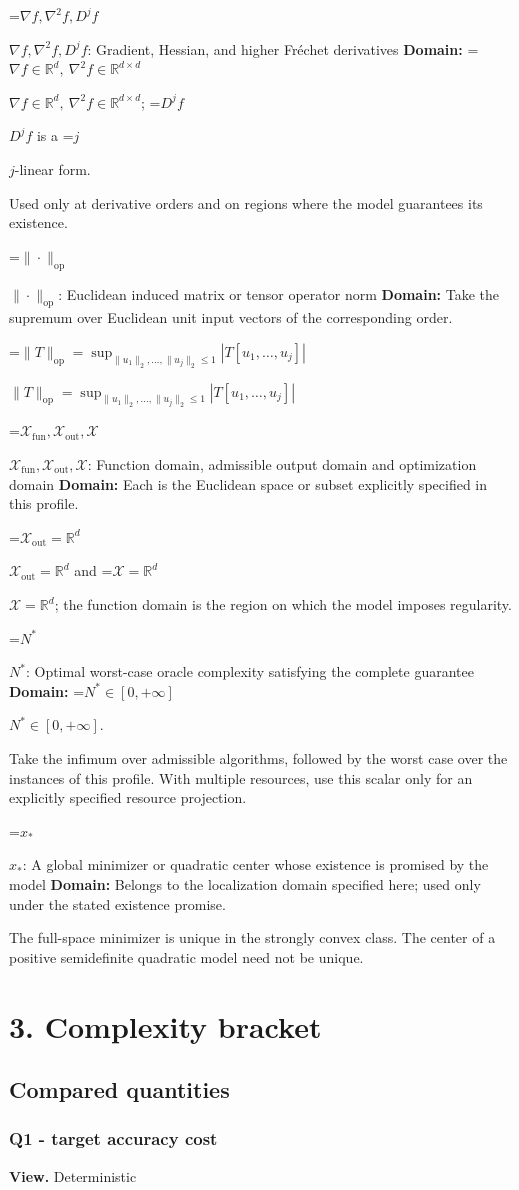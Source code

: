 \documentclass[10pt,a4paper]{article}
\newcommand{\AtlasMath}[1]{\par\begingroup\centering\setbox0=\hbox{$\displaystyle #1$}\ifdim\wd0>1.4\linewidth\typeout{ATLAS WIDE FORMULA: \the\wd0}\fi\ifdim\wd0>\linewidth\resizebox{\linewidth}{!}{\box0}\else\box0\fi\par\endgroup}
\newcommand{\AtlasInlineMath}[1]{\begingroup\setbox0=\hbox{$#1$}\ifdim\wd0>.4\linewidth\endgroup\AtlasMath{#1}\else\endgroup$#1$\fi}
\begin{document}
\AtlasInlineMath{\nabla f,\nabla^2f,D^jf}: Gradient, Hessian, and higher Fréchet derivatives \textbf{Domain:} \AtlasInlineMath{\nabla f\in\mathbb{R}^d,\ \nabla^2f\in\mathbb{R}^{d\times d}}; \AtlasInlineMath{D^jf} is a \AtlasInlineMath{j}-linear form.

Used only at derivative orders and on regions where the model guarantees its existence.

\AtlasInlineMath{\|\cdot\|_{\mathrm{op}}}: Euclidean induced matrix or tensor operator norm \textbf{Domain:} Take the supremum over Euclidean unit input vectors of the corresponding order.

\AtlasInlineMath{\|T\|_{\mathrm{op}}=\sup_{\|u_1\|_2,\ldots,\|u_j\|_2\le1}|T[u_1,\ldots,u_j]|}

\AtlasInlineMath{\mathcal{X}_{\mathrm{fun}},\mathcal{X}_{\mathrm{out}},\mathcal{X}}: Function domain, admissible output domain and optimization domain \textbf{Domain:} Each is the Euclidean space or subset explicitly specified in this profile.

\AtlasInlineMath{\mathcal{X}_{\mathrm{out}}=\mathbb{R}^d} and \AtlasInlineMath{\mathcal{X}=\mathbb{R}^d}; the function domain is the region on which the model imposes regularity.

\AtlasInlineMath{N^*}: Optimal worst-case oracle complexity satisfying the complete guarantee \textbf{Domain:} \AtlasInlineMath{N^*\in[0,+\infty]}.

Take the infimum over admissible algorithms, followed by the worst case over the instances of this profile. With multiple resources, use this scalar only for an explicitly specified resource projection.

\AtlasInlineMath{x_*}: A global minimizer or quadratic center whose existence is promised by the model \textbf{Domain:} Belongs to the localization domain specified here; used only under the stated existence promise.

The full-space minimizer is unique in the strongly convex class. The center of a positive semidefinite quadratic model need not be unique.

\section{3. Complexity bracket}
\subsection{Compared quantities}
\subsubsection{Q1 - target accuracy cost}
\textbf{View.} Deterministic
\end{document}

